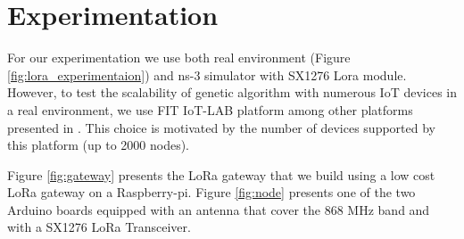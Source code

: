 \section{Experimentation} \label{sec:Experimentation}

For our experimentation we use both real environment (Figure \ref{fig:lora_experimentaion}) and ns-3 simulator with SX1276 Lora module.
However,
	to test the scalability of genetic algorithm with numerous IoT devices in a real environment,
	we use FIT IoT-LAB platform among other platforms presented in \cite{tonneau_how_2015}.
This choice is motivated by the number of devices supported by this platform (up to 2000 nodes).

Figure \ref{fig:gateway} presents the LoRa gateway that we build using a low cost LoRa gateway \cite{lowcostloragateway} on a Raspberry-pi.
Figure \ref{fig:node}  presents one of the two Arduino boards equipped with an antenna that cover the 868 MHz band and with a SX1276 LoRa Transceiver.




